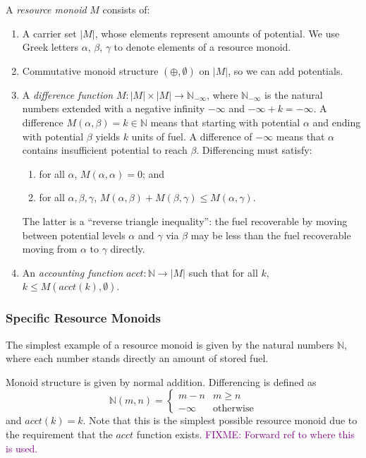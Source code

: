 \documentclass[acmsmall,review]{acmart}
\newcommand{\natinf}{\mathbb{N}_{-\infty}}
\newcommand{\bob}[1]{\textcolor{purple}{FIXME: #1}}
\begin{document}
\begin{definition}
  A \emph{resource monoid} $M$ consists of:
  \begin{enumerate}
  \item A carrier set $|M|$, whose elements represent amounts of
    potential. We use Greek letters $\alpha$, $\beta$, $\gamma$ to
    denote elements of a resource monoid.
  \item Commutative monoid structure $(\oplus,\emptyset)$ on $|M|$, so
    we can add potentials.
  \item A \emph{difference function} $M : |M| \times |M| \to \natinf$,
    where $\natinf$ is the natural numbers extended with a negative
    infinity $- \infty$ and $- \infty + k = -\infty$. A difference
    $M(\alpha, \beta) = k \in \mathbb{N}$ means that starting with
    potential $\alpha$ and ending with potential $\beta$ yields $k$
    units of fuel. A difference of $- \infty$ means that $\alpha$
    contains insufficient potential to reach $\beta$. Differencing
    must satisfy:
    \begin{enumerate}
    \item for all $\alpha$, $M(\alpha,\alpha) = 0$; and
    \item for all $\alpha, \beta, \gamma$,
      $M(\alpha, \beta) + M(\beta, \gamma) \leq M(\alpha, \gamma)$.
    \end{enumerate}
    The latter is a ``reverse triangle inequality'': the fuel
    recoverable by moving between potential levels $\alpha$ and
    $\gamma$ via $\beta$ may be less than the fuel recoverable
    moving from $\alpha$ to $\gamma$ directly.
  \item An \emph{accounting function}
    $\mathit{acct} : \mathbb{N} \to |M|$ such that for all $k$,
    $k \leq M(\mathit{acct}(k),\emptyset)$.
  \end{enumerate}
\end{definition}

\subsubsection{Specific Resource Monoids}

The simplest example of a resource monoid is given by the natural
numbers $\mathbb{N}$, where each number stands directly an amount of
stored fuel.

\begin{definition}
  Monoid structure is given by normal addition. Differencing is
  defined as
  \begin{displaymath}
    \mathbb{N}(m,n) = \left\{
      \begin{array}{ll}
        m - n & m \geq n \\
        - \infty & \textrm{otherwise}
      \end{array}\right.
  \end{displaymath}
  and $\mathit{acct}(k) = k$. Note that this is the simplest possible
  resource monoid due to the requirement that the $\mathit{acct}$
  function exists. \bob{Forward ref to where this is used.}
\end{definition}
\end{document}
